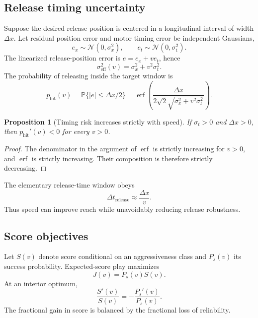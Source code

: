 \documentclass[11pt]{article}
\numberwithin{equation}{section}
\newtheorem{proposition}{Proposition}[section]
\theoremstyle{definition}
\theoremstyle{remark}
\newcommand{\erf}{\operatorname{erf}}
\newcommand{\Prob}{\mathbb{P}}
\begin{document}
\subsection{Release timing uncertainty}

Suppose the desired release position is centered in a longitudinal interval of width $\Delta x$.  Let residual position error and motor timing error be independent Gaussians,
\begin{equation}
  e_x\sim\mathcal N(0,\sigma_x^2),
  \qquad
  e_t\sim\mathcal N(0,\sigma_t^2).
\end{equation}
The linearized release-position error is $e=e_x+ve_t$, hence
\begin{equation}
  \sigma_{\mathrm{eff}}^2(v)=\sigma_x^2+v^2\sigma_t^2.
  \label{eq:sigmaeff}
\end{equation}
The probability of releasing inside the target window is
\begin{equation}
  p_{\mathrm{hit}}(v)
  =\Prob\{|e|\leq\Delta x/2\}
  =\erf\!\left(
  \frac{\Delta x}{2\sqrt2\sqrt{\sigma_x^2+v^2\sigma_t^2}}
  \right).
  \label{eq:phit}
\end{equation}

\begin{proposition}[Timing risk increases strictly with speed]
\label{prop:timing}
If $\sigma_t>0$ and $\Delta x>0$, then $p_{\mathrm{hit}}'(v)<0$ for every $v>0$.
\end{proposition}

\begin{proof}
The denominator in the argument of $\erf$ is strictly increasing for $v>0$, and $\erf$ is strictly increasing.  Their composition is therefore strictly decreasing.
\end{proof}

The elementary release-time window obeys
\begin{equation}
  \Delta t_{\mathrm{release}}\approx\frac{\Delta x}{v}.
  \label{eq:releasewindow}
\end{equation}
Thus speed can improve reach while unavoidably reducing release robustness.

\subsection{Score objectives}

Let $S(v)$ denote score conditional on an aggressiveness class and $P_s(v)$ its success probability.  Expected-score play maximizes
\begin{equation}
  J(v)=P_s(v)S(v).
\end{equation}
At an interior optimum,
\begin{equation}
  \frac{S'(v)}{S(v)}=-\frac{P_s'(v)}{P_s(v)}.
  \label{eq:scorebalance}
\end{equation}
The fractional gain in score is balanced by the fractional loss of reliability.
\end{document}
